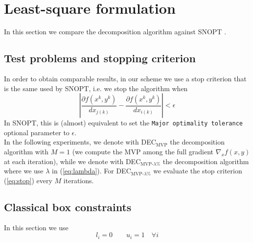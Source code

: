 \section{Least-square formulation}
In this section we compare the decomposition algorithm against SNOPT \cite{snopt}.

\subsection{Test problems and stopping criterion}
In order to obtain comparable results, in our scheme we use a stop criterion that is the same used by SNOPT, i.e. we stop the algorithm when
\begin{equation}\label{eq:stop}
\left| \frac{\partial f(x^k,y^k)}{d{x_{j(k)}}} - \frac{\partial f(x^k,y^k)}{d{x_{i(k)}} }\right| < \epsilon
\end{equation}
In SNOPT, this is (almost) equivalent to set the \texttt{Major optimality tolerance} optional parameter to $\epsilon$.\\
In the following experiments, we denote with DEC$_{\text{MVP}}$ the decomposition algorithm with $M=1$ (we compute the MVP among the full gradient $\nabla_x f(x,y)$ at each iteration), while we denote with DEC$_{\text{MVP-}\lambda\%}$ the decomposition algorithm where we use $\lambda$ in (\ref{eq:lambda}). For DEC$_{\text{MVP-}\lambda\%}$ we evaluate the stop criterion (\ref{eq:stop}) every $M$ iterations.

\subsection{Classical box constraints}
In this section we use 
\begin{equation}\label{eq:classicalbox}
l_i = 0  \qquad u_i = 1  \quad \forall i
\end{equation} 
